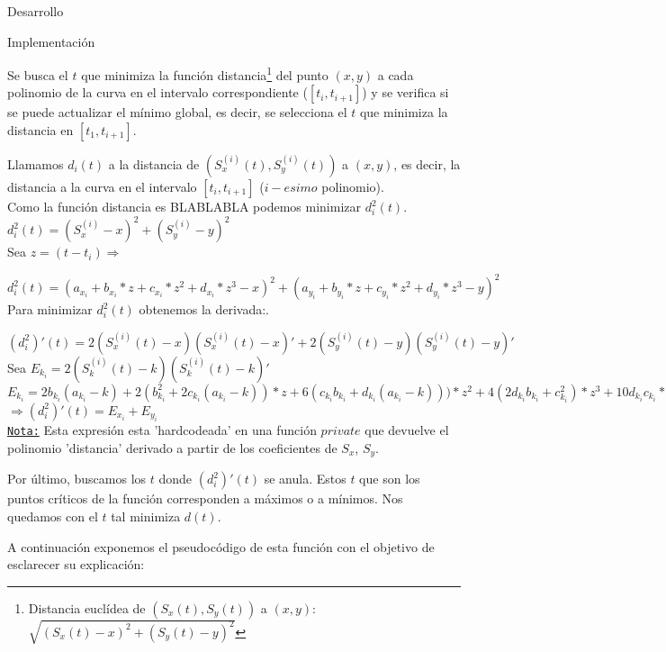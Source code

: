 \begin{section}{Desarrollo}
\begin{subsection}{Implementación}
\begin{itemize}
				Se busca el $t$ que minimiza la función distancia\footnote{Distancia euclídea de $(S_x(t),S_y(t))$ a $(x,y)$: $\sqrt{(S_x(t)-x)^2+(S_y(t)-y)^2}$} del punto $(x,y)$ a cada polinomio de la curva en el intervalo correspondiente ($[t_i,t_{i+1}]$) y se verifica si se puede actualizar el mínimo global, es decir, se selecciona el $t$ que minimiza la distancia en $[t_1,t_{i+1}]$.
				
				Llamamos $d_i(t)$ a la distancia de $(S_x^{(i)}(t),S_y^{(i)}(t))$ a $(x,y)$, es decir, la distancia a la curva en el intervalo $[t_i,t_{i+1}]$ ($i-esimo$ polinomio).\\
				
				Como la función distancia es BLABLABLA podemos minimizar $d_i^2(t)$.\\
				
				$d_i^2(t) = (S_x^{(i)}-x)^2+(S_y^{(i)}-y)^2$\\
				
				Sea $z=(t-t_i) \Rightarrow$
				
				$d_i^2(t) = (a_{x_i} + b_{x_i}*z + c_{x_i}*z^2 + d_{x_i}*z^3 - x)^2 + (a_{y_i} + b_{y_i}*z + c_{y_i}*z^2 + d_{y_i}*z^3 -y)^2$\\
				
				Para minimizar $d_i^2(t)$ obtenemos la derivada:.
				
				$(d_i^2)'(t) = 2(S_x^{(i)}(t)-x)(S_x^{(i)}(t)-x)'+2(S_y^{(i)}(t)-y)(S_y^{(i)}(t)-y)'$\\
				
				Sea $E_{k_i} = 2(S_k^{(i)}(t)-k)(S_k^{(i)}(t)-k)'$ \\
				
				$E_{k_i} = 2b_{k_i}(a_{k_i}-k)+2(b_{k_i}^2+2c_{k_i}(a_{k_i}-k))*z+6(c_{k_i}b_{k_i}+d_{k_i}(a_{k_i}-k)))*z^2+4(2d_{k_i}b_{k_i}+c_{k_i}^2)*z^3+10d_{k_i}c_{k_i}*z^4+6d_{k_i}^2*z^5$\\
				
				$\Rightarrow (d_i^2)'(t) = E_{x_i} + E_{y_i}$\\
				
				\underline{\texttt{Nota:}} Esta expresión esta 'hardcodeada' en una función $private$ que devuelve el polinomio 'distancia' derivado a partir de los coeficientes de $S_x$, $S_y$.
				
				Por último, buscamos los $t$ donde $(d_i^2)'(t)$ se anula. Estos $t$ que son los puntos críticos de la función corresponden a máximos o a mínimos.
				Nos quedamos con el $t$ tal minimiza $d(t)$.
				
				A continuación exponemos el pseudocódigo de esta función con el objetivo de esclarecer su explicación:\\
				

\end{itemize}
\end{subsection}
\end{section}
